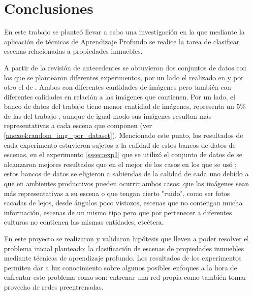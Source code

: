 \section{Conclusiones}

En este trabajo se planteó llevar a cabo una investigación en la que mediante la aplicación de técnicas de Aprendizaje Profundo se realice la tarea de clasificar escenas relacionadas a propiedades inmuebles.

A partir de la revisión de antecedentes se obtuvieron dos conjuntos de datos con los que se plantearon diferentes experimentos, por un lado el realizado en \cite{vision_based_real_estate_price_estimation} y por otro el de \cite{lstm_real_estate}. Ambos con diferentes cantidades de imágenes pero también con diferentes calidades en relación a las imágenes que contienen. Por un lado, el banco de datos del trabajo \cite{lstm_real_estate} tiene menor cantidad de imágenes, representa un 5\% de las del trabajo \cite{vision_based_real_estate_price_estimation}, aunque de igual modo sus imágenes resultan más representativas a cada escena que componen (ver \ref{anexo4:random_img_por_dataset}). Mencionado este punto, los resultados de cada experimento estuvieron sujetos a la calidad de estos bancos de datos de escenas, en el experimento \ref{sssec:exp1} que se utilizó el conjunto de datos de \cite{lstm_real_estate} se alcanzaron mejores resultados que en el mejor de los casos en los que se usó \cite{vision_based_real_estate_price_estimation}; estos bancos de datos se eligieron a sabiendas de la calidad de cada uno debido a que en ambientes productivos pueden ocurrir ambos casos: que las imágenes sean más representativas a su escena o que tengan cierto "ruido", como ser fotos sacadas de lejos, desde ángulos poco vistozos, escenas que no contengan mucha información, escenas de un mismo tipo pero que por pertenecer a diferentes culturas no contienen las mismas entidades, etcétera. 

En este proyecto se realizaron y validaron hipótesis que lleven a poder resolver el problema inicial planteado: la clasificación de escenas de propiedades inmuebles mediante técnicas de aprendizaje profundo.
Los resultados de los experimentos permiten dar a luz conocimiento sobre algunos posibles enfoques a la hora de enfrentar este problema como son: entrenar una red propia como también tomar provecho de redes preentrenadas. 

